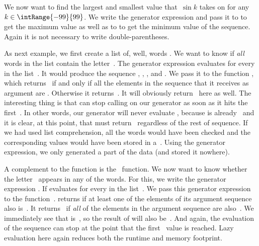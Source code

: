 We now want to find the largest and smallest value that~$\sin{k}$ takes on for any~$k\in\intRange{-99}{99}$.
We write the generator expression  and pass it to  to get the maximum value as well as to  to get the minimum value of the sequence.
Again it is not necessary to write double-parentheses.%
%
\begin{sloppypar}%
As next example, we first create a list  of, well, words .
We want to know if \emph{all} words in the list contain the letter~.
The generator expression  evaluates  for every  in the list~.
It would produce the sequence , , , and .
We pass it to the function , which returns~ if and only if all the elements in the sequence that it receives as argument are .
Otherwise it returns~.
It will obviously return~ here as well.
The interesting thing is that  can stop calling  on our generator as soon as it hits the first~.
In other words, our generator will never evaluate , because  is already~ and it is clear, at this point, that  must return~ regardless of the rest of sequence.
If we had used list comprehension, all the words would have been checked and the corresponding  values would have been stored in a~.
Using the generator expression, we only generated a part of the data (and stored it nowhere).%
\end{sloppypar}%
%
\begin{sloppypar}%
A complement to the  function is the ~function.
We now want to know whether the letter~ appears in any of the words.
For this, we write the generator expression .
If evaluates  for every  in the list~.
We pass this generator expression to the function~.
 returns  if at least one of the elements of its argument sequence also is~.
It returns~ if \emph{all} of the elements in the argument sequence are also~.
We immediately see that  is~, so the result of  will also be~.
And again, the evaluation of the sequence can stop at the point that the first~ value is reached.
Lazy evaluation here again reduces both the runtime and memory footprint.%
\end{sloppypar}%
